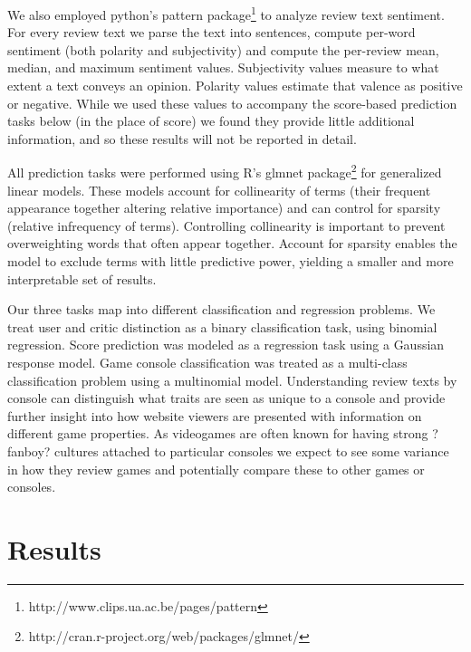 \documentclass[letterpaper]{article}
\begin{document}
We also employed python's pattern package\footnote{http://www.clips.ua.ac.be/pages/pattern} to analyze review text sentiment. For every review text we parse the text into sentences, compute per-word sentiment (both polarity and subjectivity) and compute the per-review mean, median, and maximum sentiment values. Subjectivity values measure to what extent a text conveys an opinion. Polarity values estimate that valence as positive or negative. While we used these values to accompany the score-based prediction tasks below (in the place of score) we found they provide little additional information, and so these results will not be reported in detail.

All prediction tasks were performed using R's glmnet package\footnote{http://cran.r-project.org/web/packages/glmnet/} for generalized linear models. These models account for collinearity of terms (their frequent appearance together altering relative importance) and can control for sparsity (relative infrequency of terms). Controlling collinearity is important to prevent overweighting words that often appear together. Account for sparsity enables the model to exclude terms with little predictive power, yielding a smaller and more interpretable set of results.

Our three tasks map into different classification and regression problems. We treat user and critic distinction as a binary classification task, using binomial regression. Score prediction was modeled as a regression task using a Gaussian response model. Game console classification was treated as a multi-class classification problem using a multinomial model. Understanding review texts by console can distinguish what traits are seen as unique to a console and provide further insight into how website viewers are presented with information on different game properties. As videogames are often known for having strong ?fanboy? cultures attached to particular consoles we expect to see some variance in how they review games and potentially compare these to other games or consoles.


\section{Results}
\end{document}
